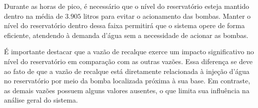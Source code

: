 Durante as horas de pico, é necessário que o nível do reservatório esteja mantido dentro na média de $3.905$ litros para evitar o acionamento das bombas. Manter o nível do reservatório dentro dessa faixa permitirá que o sistema opere de forma eficiente, atendendo à demanda d'água sem a necessidade de acionar as bombas.

É importante destacar que a vazão de recalque exerce um impacto significativo no nível do reservatório em comparação com as outras vazões. Essa diferença se deve ao fato de que a vazão de recalque está diretamente relacionada à injeção d'água no reservatório por meio da bomba localizada próxima à sua base. Em contraste, as demais vazões possuem alguns valores ausentes, o que limita sua influência na análise geral do sistema.
